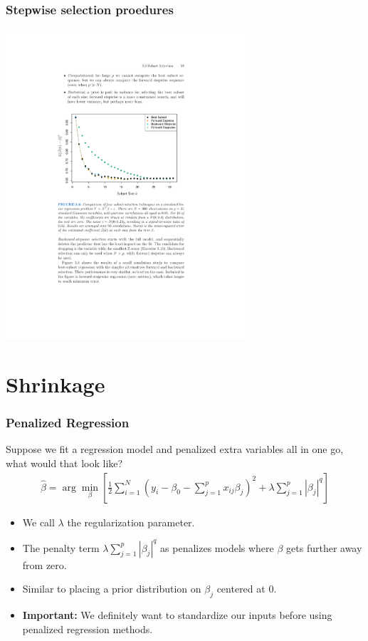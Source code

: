 \begin{frame}
\frametitle{Stepwise selection proedures}
\begin{center}
\includegraphics[width=3.5in]{./resources/subsetstepwise}
\end{center}
\end{frame}

\section{Shrinkage}

\begin{frame}
\frametitle{Penalized Regression}
Suppose we fit a regression model and penalized extra variables all in one go, what would that look like?
\begin{eqnarray*}
\hat{\beta} = \arg \min_{\beta} \left[\frac{1}{2} \sum_{i=1}^N (y_i - \beta_0 - \sum_{j=1}^p x_{ij} \beta_j)^2 + \lambda \sum_{j=1}^p | \beta_j|^{q} \right]
\end{eqnarray*}
\begin{itemize}
    \item We call $\lambda$ the \alert{regularization} parameter.
    \item The penalty term $\lambda \sum_{j=1}^p | \beta_j|^{q}$ as penalizes models where $\beta$ gets further away from zero.
    \item Similar to placing a \alert{prior distribution} on $\beta_j$ centered at 0.
    \item \textbf{Important:} We definitely want to \alert{standardize} our inputs before using penalized regression methods.
\end{itemize}
\end{frame}

